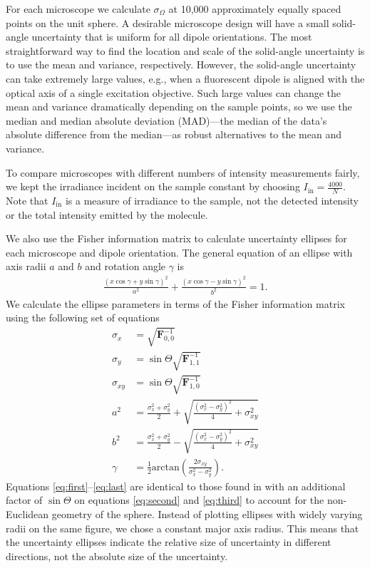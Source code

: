 \documentclass[10pt]{article}
\providecommand{\mb}[1]{\mathbf{#1}}
\begin{document}
For each microscope we calculate $\sigma_{\Omega}$ at 10,000 approximately
equally spaced points on the unit sphere. A desirable microscope design will
have a small solid-angle uncertainty that is uniform for all dipole
orientations. The most straightforward way to find the location and scale of the
solid-angle uncertainty is to use the mean and variance, respectively. However,
the solid-angle uncertainty can take extremely large values, e.g., when a
fluorescent dipole is aligned with the optical axis of a single excitation
objective. Such large values can change the mean and variance dramatically
depending on the sample points, so we use the median and median absolute
deviation (MAD)---the median of the data's absolute difference from the
median---as robust alternatives to the mean and variance.

To compare microscopes with different numbers of intensity measurements fairly,
we kept the irradiance incident on the sample constant by choosing
$I_{\text{in}} = \frac{4000}{N}$. Note that $I_{\text{in}}$ is a measure of
irradiance to the sample, not the detected intensity or the total intensity
emitted by the molecule.

We also use the Fisher information matrix to calculate uncertainty ellipses for
each microscope and dipole orientation. The general equation of an ellipse
with axis radii $a$ and $b$ and rotation angle $\gamma$ is
\begin{align}
  \frac{(x\cos\gamma + y\sin\gamma)^2}{a^2} + \frac{(x\cos\gamma - y\sin\gamma)^2}{b^2} =1. 
\end{align}
We calculate the ellipse parameters in terms of the Fisher information matrix
using the following set of equations
\begin{align}
  \sigma_x &= \sqrt{\mb{F}^{-1}_{0,0}} \label{eq:first}\\
  \sigma_y &= \sin\Theta\sqrt{\mb{F}^{-1}_{1,1}} \label{eq:second}\\ 
  \sigma_{xy} &= \sin\Theta\sqrt{\mb{F}^{-1}_{1,0}} \label{eq:third}\\  
  a^2 &= \frac{\sigma_x^2 + \sigma_y^2}{2} + \sqrt{\frac{(\sigma_x^2 - \sigma_y^2)^2}{4} + \sigma_{xy}^2}\\
  b^2 &= \frac{\sigma_x^2 + \sigma_y^2}{2} - \sqrt{\frac{(\sigma_x^2 - \sigma_y^2)^2}{4} + \sigma_{xy}^2}\\
  \gamma &= \frac{1}{2}\text{arctan}\left(\frac{2\sigma_{xy}}{\sigma_x^2 - \sigma_y^2}\right). \label{eq:last}
\end{align}
Equations \ref{eq:first}--\ref{eq:last} are identical to those found in
\cite{coe2009} with an additional factor of $\sin\Theta$ on equations
\ref{eq:second} and \ref{eq:third} to account for the non-Euclidean geometry of
the sphere. Instead of plotting ellipses with widely varying radii on the same
figure, we chose a constant major axis radius. This means that the uncertainty
ellipses indicate the relative size of uncertainty in different directions, not
the absolute size of the uncertainty.
\end{document}
